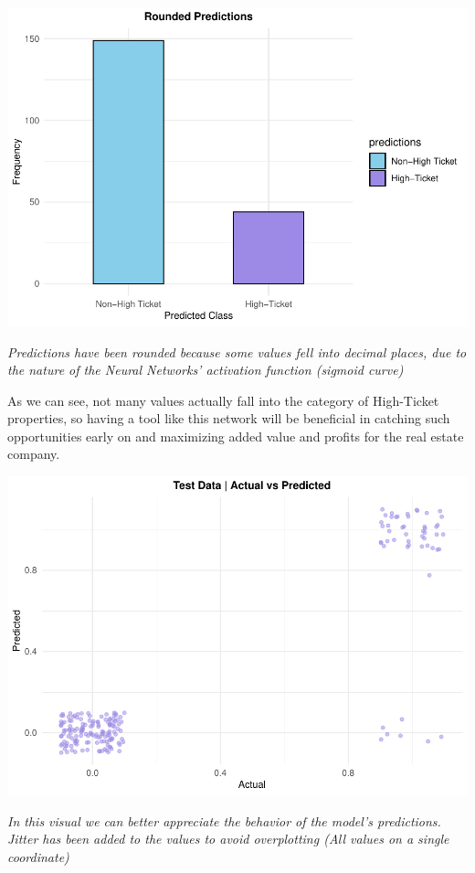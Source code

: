 \documentclass[
]{article}
\begin{document}
\includegraphics{2024_groupXX_report_files/figure-latex/NN Predictions Chart-1.pdf}

\emph{Predictions have been rounded because some values fell into
decimal places, due to the nature of the Neural Networks' activation
function (sigmoid curve)}

As we can see, not many values actually fall into the category of
High-Ticket properties, so having a tool like this network will be
beneficial in catching such opportunities early on and maximizing added
value and profits for the real estate company.

\includegraphics{2024_groupXX_report_files/figure-latex/NN Predictions Visual-1.pdf}

\emph{In this visual we can better appreciate the behavior of the
model's predictions. Jitter has been added to the values to avoid
overplotting (All values on a single coordinate)}
\end{document}
